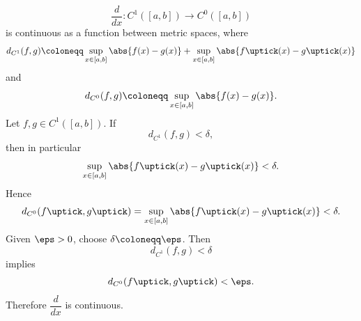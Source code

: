 \begin{proposition}{
    \[
        \dfrac{d}{dx}: C^1([a,b])\to C^0([a,b])
    \]
    is continuous as a function between metric spaces, where
    \[
        d_{C^1}(f,g) \coloneqq \sup_{x\in[a,b]}\abs{f(x) - g(x)} + \sup_{x\in[a,b]}\abs{f\uptick(x) - g\uptick(x)}
    \]
    and
    \[
        d_{C^0}(f,g) \coloneqq \sup_{x\in[a,b]}\abs{f(x) - g(x)}.
    \]
}
    Let $f,g\in C^1([a,b])$.    If
    \[
        d_{C^1}(f,g) < \delta,
    \]
    then in particular
    \[
        \sup_{x\in[a,b]}\abs{f\uptick(x) - g\uptick(x)} < \delta.
    \]
    Hence
    \[
        d_{C^0}(f\uptick,g\uptick) = \sup_{x\in[a,b]} \abs{f\uptick(x) - g\uptick(x)} < \delta.
    \]
    Given $\eps > 0$, choose $\delta \coloneqq \eps$.
    Then
    \[
        d_{C^1}(f,g) < \delta
    \]
    implies
    \[
        d_{C^0}(f\uptick,g\uptick) < \eps.
    \]
    Therefore $\dfrac{d}{dx}$ is continuous.
\end{proposition}
